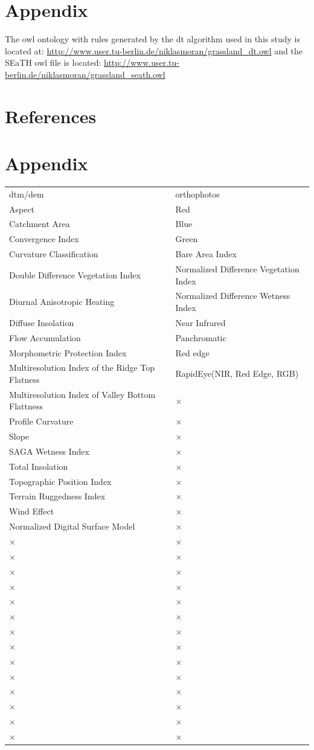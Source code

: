 \documentclass[authoryear,review,12pt,number]{elsarticle}
\begin{document}
\section{Appendix}
The \gls{owl} ontology with rules generated by the \gls{dt} algorithm used in 
this study is located at: 
\url{http://www.user.tu-berlin.de/niklasmoran/grassland_dt.owl} and the SEaTH 
\gls{owl} file is located: 
\url{http://www.user.tu-berlin.de/niklasmoran/grassland_seath.owl}

\section{References}

\section{Appendix}
\begin{center}
\begin{tabular}{ll}
\label{tab:indices}
dtm/dem & orthophotos\\
\cline{1-2}
Aspect & Red\\
Catchment Area & Blue\\
Convergence Index & Green\\
Curvature Classification & Bare Area Index\\
Double Difference Vegetation Index & Normalized Difference Vegetation Index\\
Diurnal Anisotropic Heating & Normalized Difference Wetness Index\\
Diffuse Insolation & Near Infrared\\
Flow Accumulation & Panchromatic\\
Morphometric Protection Index & Red edge\\
Multiresolution Index of the Ridge Top Flatness & RapidEye(NIR, Red Edge, RGB)\\
Multiresolution Index of Valley Bottom Flattness & ×\\
Profile Curvature & ×\\
Slope & ×\\
SAGA Wetness Index & ×\\
Total Insolation & ×\\
Topographic Position Index & ×\\
Terrain Ruggedness Index & ×\\
Wind Effect & ×\\
Normalized Digital Surface Model & ×\\
× & ×\\
× & ×\\
× & ×\\
× & ×\\
× & ×\\
× & ×\\
× & ×\\
× & ×\\
× & ×\\
× & ×\\
× & ×\\
× & ×\\
× & ×\\
× & ×
\end{tabular}
\end{center}
\end{document}
